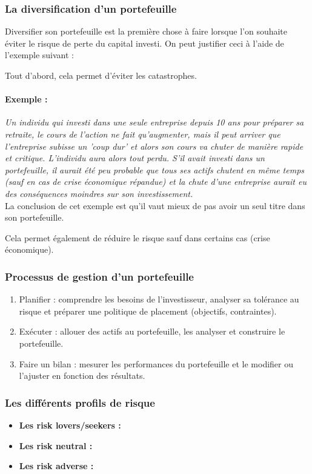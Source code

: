 \subsubsection{La diversification d'un portefeuille}
Diversifier son portefeuille est la première chose à faire lorsque l'on souhaite éviter le risque de perte du capital investi. On peut justifier ceci à l'aide de l'exemple suivant :

Tout d'abord, cela permet d'éviter les catastrophes.
\paragraph{Exemple :} \textit{Un individu qui investi dans une seule entreprise depuis 10 ans pour préparer sa retraite, le cours de l'action ne fait qu'augmenter, mais il peut arriver que l'entreprise subisse un 'coup dur' et alors son cours va chuter de manière rapide et critique. L'individu aura alors tout perdu.
	  S'il avait investi dans un portefeuille, il aurait été peu probable que tous ses actifs chutent en même temps (sauf en cas de crise économique répandue) et la chute d'une entreprise aurait eu des conséquences moindres sur son investissement.}\\
La conclusion de cet exemple est qu'il vaut mieux de pas avoir un seul titre dans son portefeuille.

Cela permet également de réduire le risque sauf dans certains cas (crise économique).


\subsubsection{Processus de gestion d'un portefeuille}
\begin{enumerate}
 \item Planifier : comprendre les besoins de l'investisseur, analyser sa tolérance au risque et préparer une politique de placement (objectifs, contraintes).
 \item Exécuter : allouer des actifs au portefeuille, les analyser et construire le portefeuille.
 \item Faire un bilan : mesurer les performances du portefeuille et le modifier ou l'ajuster en fonction des résultats.
\end{enumerate}


\subsubsection{Les différents profils de risque}
\begin{itemize}
 \item \textbf{Les risk lovers/seekers :}
 \item \textbf{Les risk neutral :}
 \item \textbf{Les risk adverse :}
\end{itemize}


